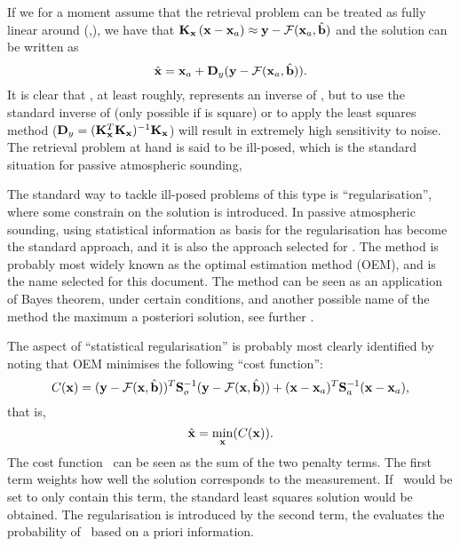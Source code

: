If we for a moment assume that the retrieval problem can be treated as fully
linear around (,\FrwMdlVctHat), we
have that $\mathbf{K}_{\mathbf{x}}\left(\mathbf{x}-\mathbf{x}_{a}\right)\approx \mathbf{y}
-\mathcal{F}(\mathbf{x}_{a},\hat{\mathbf{b}})$ and the solution can be written as
\begin{equation}
  \label{eq:linretrieval}
  \hat{\mathbf{x}} = \mathbf{x}_{a} + \mathbf{D}_{y}(\mathbf{y}-\mathcal{F}(\mathbf{x}_{a},\hat{\mathbf{b}})).
\end{equation}
It is clear that \CtrFncMtr, at least roughly, represents an inverse of
\aWfnMtr{\SttVct}, but to use the standard inverse of \aWfnMtr{\SttVct} (only
possible if \aWfnMtr{\SttVct} is square) or to apply the least squares method
($\mathbf{D}_{y}=(\mathbf{K}_{\mathbf{x}}^T\mathbf{K}_{\mathbf{x}})^{-1}\mathbf{K}_{\mathbf{x}}$)
will result in extremely high sensitivity to noise. The retrieval problem at
hand is said to be ill-posed, which is the standard situation for passive
atmospheric sounding,

The standard way to tackle ill-posed problems of this type is
``regularisation'', where some constrain on the solution is introduced. In
passive atmospheric sounding, using statistical information as basis for the
regularisation has become the standard approach, and it is also the approach
selected for \smr. The method is probably most widely known as the optimal
estimation method (OEM), and is the name selected for this document. The method
can be seen as an application of Bayes theorem, under certain conditions, and
another possible name of the method the maximum a posteriori solution, see
further \citet{rodgers:00}.

The aspect of ``statistical regularisation'' is probably most clearly
identified by noting that OEM minimises the following ``cost function'':
\begin{equation}
  \label{eq:costfun}
  C(\mathbf{x}) = (\mathbf{y}-\mathcal{F}(\mathbf{x},\hat{\mathbf{b}}))^T\mathbf{S}_{o}^{-1}
  (\mathbf{y}-\mathcal{F}(\mathbf{x},\hat{\mathbf{b}})) +
  (\mathbf{x}-\mathbf{x}_{a})^T\mathbf{S}_{a}^{-1}(\mathbf{x}-\mathbf{x}_{a}),
\end{equation}
that is,
\begin{equation}
  \hat{\mathbf{x}} = \min\limits_{\mathbf{x}}(C(\mathbf{x})).
\end{equation}
The cost function \CstFnc\ can be seen as the sum of the two penalty terms. The
first term weights how well the solution corresponds to the measurement. If
\CstFnc\ would be set to only contain this term, the standard least squares
solution would be obtained. The regularisation is introduced by the second
term, the evaluates the probability of \SttVct\ based on a priori
information.

